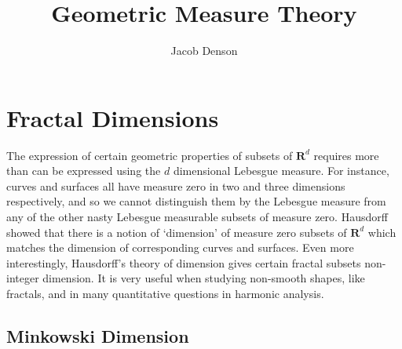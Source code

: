 

\title{Geometric Measure Theory}
\author{Jacob Denson}




\maketitle

\tableofcontents


\chapter{Fractal Dimensions}

The expression of certain geometric properties of subsets of $\mathbf{R}^d$ requires more than can be expressed using the $d$ dimensional Lebesgue measure. For instance, curves and surfaces all have measure zero in two and three dimensions respectively, and so we cannot distinguish them by the Lebesgue measure from any of the other nasty Lebesgue measurable subsets of measure zero. Hausdorff showed that there is a notion of `dimension' of measure zero subsets of $\mathbf{R}^d$ which matches the dimension of corresponding curves and surfaces. Even more interestingly, Hausdorff's theory of dimension gives certain fractal subsets non-integer dimension. It is very useful when studying non-smooth shapes, like fractals, and in many quantitative questions in harmonic analysis.


\section{Minkowski Dimension}

